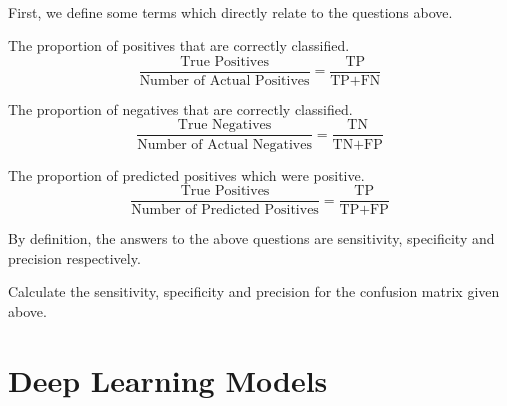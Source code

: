 \documentclass[11pt,fleqn]{book} %
\begin{document}
\noindent
\\First, we define some terms which directly relate to the questions above.\\

\begin{definition}
The proportion of positives that are correctly classified.
\begin{equation*}
	\frac{\text{True Positives}}{\text{Number of Actual Positives}} = \frac{\text{TP}}{\text{TP+FN}}
\end{equation*}
\end{definition}

\begin{definition}[Specificity]
The proportion of negatives that are correctly classified.
\begin{equation*}
	\frac{\text{True Negatives}}{\text{Number of Actual Negatives}} = \frac{\text{TN}}{\text{TN+FP}}
\end{equation*}
\end{definition}

\begin{definition}[Precision]
The proportion of predicted positives which were positive.
\begin{equation*}
	\frac{\text{True Positives}}{\text{Number of Predicted Positives}} = \frac{\text{TP}}{\text{TP+FP}}
\end{equation*}
\end{definition}

\begin{example}
	By definition, the answers to the above questions are sensitivity, specificity and precision respectively.
\end{example}

\begin{exercise}
Calculate the sensitivity, specificity and precision for the confusion matrix given above.
\end{exercise}



\chapter{Deep Learning Models}
\end{document}
